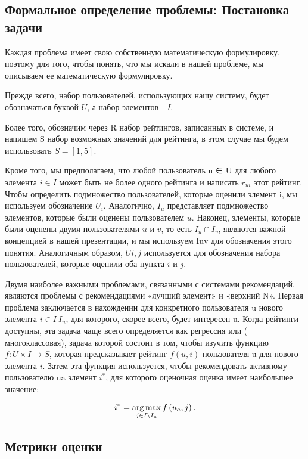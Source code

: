 
\subsection{Формальное определение проблемы: Постановка задачи}
Каждая проблема имеет свою собственную математическую формулировку, поэтому для того, чтобы понять, что мы искали в нашей проблеме, мы описываем ее математическую формулировку.

Прежде всего, набор пользователей, использующих нашу систему, будет обозначаться буквой $U$, а набор элементов - $I$.

Более того, обозначим через R набор рейтингов, записанных в системе, и напишем S набор возможных значений для рейтинга, в этом случае мы будем использовать $S = [1, 5]$. 

Кроме того, мы предполагаем, что любой пользователь u ∈ U для любого элемента $i ∈ I$ может быть не более одного рейтинга и написать $r_{ui}$ этот рейтинг. Чтобы определить подмножество пользователей, которые оценили элемент i, мы используем обозначение $U_{i}$. Аналогично, $I_{u}$ представляет подмножество элементов, которые были оценены пользователем $u$. Наконец, элементы, которые были оценены двумя пользователями $u$ и $v$, то есть $I_{u} \cap I_{v}$, являются важной концепцией в нашей презентации, и мы используем Iuv для обозначения этого понятия. Аналогичным образом, $U{i,j}$  используется для обозначения набора пользователей, которые оценили оба пункта $i$ и $j$.

Двумя наиболее важными проблемами, связанными с системами рекомендаций, являются проблемы с рекомендациями «лучший элемент» и «верхний N». Первая проблема заключается в нахождении для конкретного пользователя u нового элемента $i ∈ I \ I_{u}$, для которого, скорее всего, будет интересен u. Когда рейтинги доступны, эта задача чаще всего определяется как регрессия или ( многоклассовая), задача которой состоит в том, чтобы изучить функцию $f: U \times I \rightarrow  S$, которая предсказывает рейтинг $f\left ( u,i \right )$ пользователя u для нового элемента $i$. Затем эта функция используется, чтобы рекомендовать активному пользователю ua элемент $i^{*}$, для которого оценочная оценка имеет наибольшее значение:

\begin{equation}
i^{*}=\operatorname*{arg\,max}_{j\in I\setminus I_{u}}\\f\left ( u_{a},j \right ).
\label{F:F1}
\end{equation}


\subsection{Метрики оценки}

